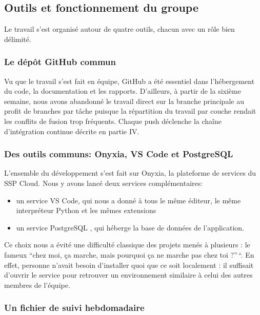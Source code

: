 \documentclass[a4paper,12pt]{article}
\providecommand{\tightlist}{\setlength{\itemsep}{0pt}\setlength{\parskip}{0pt}}
\providecommand{\tightlist}{}
\begin{document}
\subsection{Outils et fonctionnement du
groupe}\label{outils-et-fonctionnement-du-groupe}

Le travail s'est organisé autour de quatre outils, chacun avec un rôle
bien délimité.

\subsubsection{Le dépôt GitHub
commun}\label{le-duxe9puxf4t-github-commun}

Vu que le travail s'est fait en équipe, GitHub a été essentiel dans
l'hébergement du code, la documentation et les rapports. D'ailleurs, à
partir de la sixième semaine, nous avons abandonné le travail direct sur
la branche principale au profit de branches par tâche puisque la
répartition du travail par couche rendait les conflits de fusion trop
fréquents. Chaque push déclenche la chaîne d'intégration continue
décrite en partie IV.

\subsubsection{Des outils communs: Onyxia, VS Code et
PostgreSQL}\label{des-outils-communs-onyxia-vs-code-et-postgresql}

L'ensemble du développement s'est fait sur Onyxia, la plateforme de
services du SSP Cloud. Nous y avons lancé deux services complémentaires:

\begin{itemize}
\tightlist
\item
  un service VS Code, qui nous a donné à tous le même éditeur, le même
  interpréteur Python et les mêmes extensions
\item
  un service PostgreSQL , qui héberge la base de données de
  l'application.
\end{itemize}

Ce choix nous a évité une difficulté classique des projets menés à
plusieurs : le fameux ``chez moi, ça marche, mais pourquoi ça ne marche
pas chez toi ?''\,``. En effet, personne n'avait besoin d'installer quoi
que ce soit localement : il suffisait d'ouvrir le service pour retrouver
un environnement similaire à celui des autres membres de l'équipe.

\subsubsection{Un fichier de suivi
hebdomadaire}\label{un-fichier-de-suivi-hebdomadaire}
\end{document}
